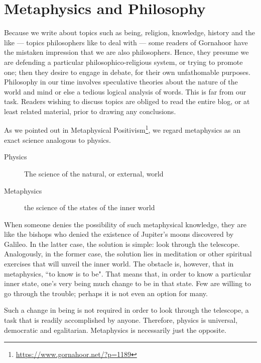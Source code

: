 \section{Metaphysics and Philosophy}

Because we write about topics such as being, religion, knowledge, history and the like — topics philosophers like to deal with — some readers of Gornahoor have the mistaken impression that we are also philosophers. Hence, they presume we are defending a particular philosophico-religious system, or trying to promote one; then they desire to engage in debate, for their own unfathomable purposes. Philosophy in our time involves speculative theories about the nature of the world and mind or else a tedious logical analysis of words. This is far from our task. Readers wishing to discuss topics are obliged to read the entire blog, or at least related material, prior to drawing any conclusions.

As we pointed out in Metaphysical Positivism\footnote{\url{https://www.gornahoor.net/?p=1189}}, we regard metaphysics as an exact science analogous to physics.

\begin{description}
\item[Physics ]

The science of the natural, or external, world 

\item[Metaphysics ]

the science of the states of the inner world 

\end{description}
When someone denies the possibility of such metaphysical knowledge, they are like the bishops who denied the existence of Jupiter's moons discovered by Galileo. In the latter case, the solution is simple: look through the telescope. Analogously, in the former case, the solution lies in meditation or other spiritual exercises that will unveil the inner world. The obstacle is, however, that in metaphysics, ``to know is to be". That means that, in order to know a particular inner state, one's very being much change to be in that state. Few are willing to go through the trouble; perhaps it is not even an option for many.

Such a change in being is not required in order to look through the telescope, a task that is readily accomplished by anyone. Therefore, physics is universal, democratic and egalitarian. Metaphysics is necessarily just the opposite.

